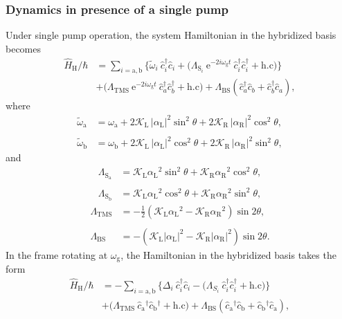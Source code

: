 \documentclass[%
reprint,
floatfix,
superscriptaddress,
amsmath,amssymb,
aps,
pra,
]{revtex4-2}
\newcommand*{\scrpt}[1]{\mathrm{#1}}
\newcommand*{\s}[1]{\ensuremath{_\scrpt{#1}}}
\begin{document}
\subsubsection{Dynamics in presence of a single pump}
\label{A_Theory_Single_Pump_hybrid}
%
Under single pump operation, the system Hamiltonian in the hybridized basis becomes
%
\begin{align}
   \label{H_lin_H_single}
    \hat H\s{H} / \hbar & = \sum_{i = \mathrm{a}, \mathrm{b}} \Big \lbrace \tilde{\omega}_i \: \hat c_i^{\dagger} \hat c_i  + \Big( \Lambda\s{S_\textit{i}} \: \mathrm{e}^{-2 i \omega\s{g} t}  \: \hat c_i^{\dagger} \hat c_i^{\dagger} + \mathrm{h.c} \Big) \Big \rbrace  \\
    & + \Big( \Lambda\s{TMS} \: \mathrm{e}^{-2 i \omega\s{g} t} \: \hat c_a^{\dagger} \hat c_b^{\dagger} + \mathrm{h.c} \Big) + \Lambda\s{BS} \left(\hat c_a^{\dagger} \hat c_b + \hat c_b^{\dagger} \hat c_a \right), \nonumber
\end{align}
% 
where
%
\begin{align}
\label{WAB_HL_single}
\tilde{\omega}\s{a}  & = \omega\s{a}  + 2 \mathcal{K}\s{L} \, |\alpha\s{L}|^2 \sin^2 \theta + 2 \mathcal{K}\s{R} \, |\alpha\s{R}|^2  \cos^2\theta , \nonumber \\
\\
\tilde{\omega}\s{b}   & = \omega\s{b}  +  2 \mathcal{K}\s{L} \, |\alpha\s{L}|^2 \cos^2 \theta + 2 \mathcal{K}\s{R} \, |\alpha\s{R}|^2 \sin^2\theta  , \nonumber 
\end{align}
%
and
%
\begin{align}
\label{WAB_HL_single}
\Lambda\s{S\s{a}} & =\mathcal{K}\s{L} \alpha\s{L}^2 \sin^2 \theta + \mathcal{K}\s{R} \alpha\s{R}^2 \cos^2 \theta,  \nonumber \\
\\
\Lambda\s{S\s{b}} & =\mathcal{K}\s{L} \alpha\s{L}^2 \cos^2 \theta + \mathcal{K}\s{R} \alpha\s{R}^2 \sin^2 \theta,  \nonumber
\end{align}
%
\begin{align}
\label{WAB_HL_single}
\Lambda\s{TMS} & = -\frac{1}{2} \left( \mathcal{K}\s{L} \alpha\s{L}^2 - \mathcal{K}\s{R} \alpha\s{R}^2 \right) \sin 2\theta,  \\
\nonumber \\
\Lambda\s{BS} & = - \left( \mathcal{K}\s{L} |\alpha\s{L}|^2 - \mathcal{K}\s{R} |\alpha\s{R}|^2 \right) \sin 2\theta.
\end{align}
%
In the frame rotating at $\omega\s{g}$, the Hamiltonian in the hybridized basis takes the form
%
\begin{align}
   \label{H_lin_H_single_R}
    \hat H\s{H} / \hbar & = - \sum_{i = \mathrm{a}, \mathrm{b}} \Big \lbrace \Delta_i \: \hat c_i^{\dagger} \hat c_i  - \Big( \Lambda_{S_i} \: \hat c_i^{\dagger} \hat c_i^{\dagger} + \mathrm{h.c} \Big) \Big \rbrace  \\
    & + \Big( \Lambda\s{TMS} \: \hat c\s{a}^{\dagger} \hat c\s{b}^{\dagger} + \mathrm{h.c} \Big) + \Lambda\s{BS} \left(\hat c\s{a}^{\dagger} \hat c\s{b} + \hat c\s{b}^{\dagger} \hat c\s{a} \right), \nonumber
\end{align}
\end{document}
